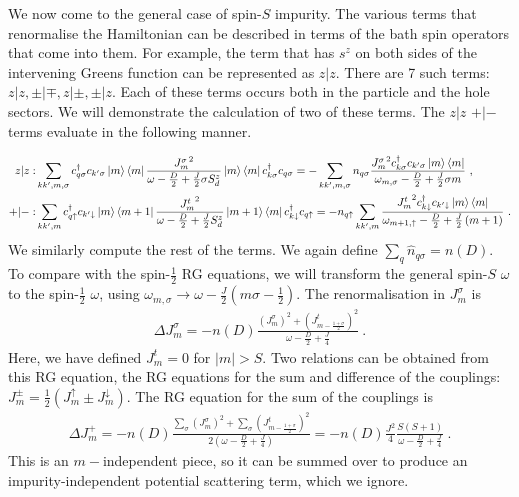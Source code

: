 \documentclass[reprint,onecolumn,prb,superscriptaddress]{revtex4-2}
\begin{document}
We now come to the general case of spin-\(S\) impurity. The various terms that renormalise the Hamiltonian can be described in terms of the bath spin operators that come into them. For example, the term that has \(s^z\) on both sides of the intervening Greens function can be represented as \(z|z\). There are 7 such terms: \(z|z, \pm|\mp, z|\pm, \pm|z\). Each of these terms occurs both in the particle and the hole sectors. We will demonstrate the calculation of two of these terms. The \(z|z\) \(+|-\) terms evaluate in the following manner.

\begin{align}
	z|z: & \sum_{kk^\prime,m,\sigma} c^\dagger_{q \sigma} c_{k^\prime \sigma} \ket{m}\bra{m}\frac{{J^\sigma_m}^2}{\omega - \frac{D}{2} + \frac{J}{2}\sigma S_d^z}\ket{m}\bra{m} c^\dagger_{k \sigma}c_{q \sigma} = -\sum_{kk^\prime,m,\sigma}n_{q \sigma}\frac{{J^\sigma_m}^2 c^\dagger_{k \sigma}c_{k^\prime\sigma} \ket{m}\bra{m}}{\omega_{m, \sigma} - \frac{D}{2} + \frac{J}{2}\sigma m}~,\\
	+|-: & \sum_{kk^\prime,m} c^\dagger_{q \uparrow} c_{k^\prime \downarrow} \ket{m}\bra{m+1}\frac{{J^t_m}^2}{\omega - \frac{D}{2} + \frac{J}{2}S_d^z}\ket{m+1}\bra{m} c^\dagger_{k \downarrow}c_{q \uparrow} = -n_{q \uparrow}\sum_{kk^\prime,m}\frac{{J^t_m}^2 c^\dagger_{k \downarrow}c_{k^\prime\downarrow} \ket{m}\bra{m}}{\omega_{m+1, \uparrow} - \frac{D}{2} + \frac{J}{2}\left( m+1 \right) }~.
\end{align}
We similarly compute the rest of the terms. We again define \(\sum_q \hat n_{q\sigma} = n(D)\). To compare with the spin-\(\frac{1}{2}\) RG equations, we will transform the general spin-\(S\) \(\omega\) to the spin-\(\frac{1}{2}\) \( \omega\), using \(\omega_{m,\sigma} \to \omega - \frac{J}{2}\left(m\sigma - \frac{1}{2}\right)\).
The renormalisation in \(J^\sigma_m\) is
\begin{equation}\begin{aligned}
	\Delta J^\sigma_{m} = - n(D) \frac{\left( J^\sigma_m \right) ^2 + \left( J^t_{m-\frac{1+\sigma}{2}} \right) ^2}{\omega - \frac{D}{2} + \frac{J}{4}}~.
\end{aligned}\end{equation}
Here, we have defined \(J^t_m = 0\) for \( |m| > S\). Two relations can be obtained from this RG equation, the RG equations for the sum and difference of the couplings: \(J^\pm_m = \frac{1}{2}\left(J^\uparrow_m \pm J^\downarrow_m\right) \). The RG equation for the sum of the couplings is
\begin{equation}\begin{aligned}
	\Delta J^+_m = -n(D)\frac{\sum_\sigma \left( J^\sigma_m \right) ^2 + \sum_\sigma \left( J^t_{m-\frac{1+\sigma}{2}} \right) ^2}{2\left(\omega - \frac{D}{2} + \frac{J}{4}\right)} = -n(D)\frac{J^2}{4}\frac{S(S+1)}{\omega - \frac{D}{2} + \frac{J}{4}}~.
\end{aligned}\end{equation}
This is an \(m-\)independent piece, so it can be summed over to produce an impurity-independent potential scattering term, which we ignore. 
\end{document}
